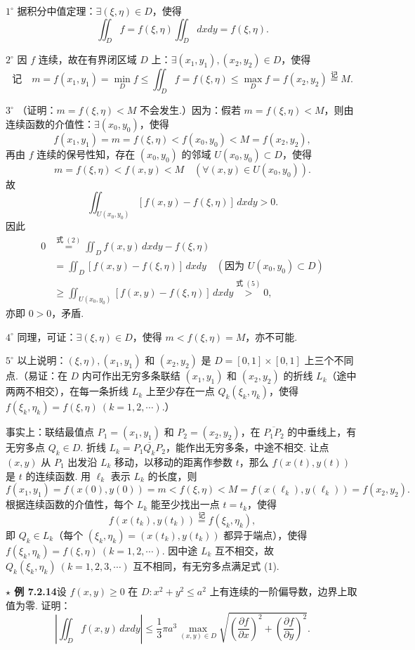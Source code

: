\documentclass[UTF8,12pt,a4paper,fontset=fandol]{ctexart}
\begin{document}
$1^\circ$ 据积分中值定理：$\exists(\xi,\eta)\in D$，使得
\[
\iint_Df=f(\xi,\eta)\iint_Ddxdy=f(\xi,\eta). \tag{2}
\]

$2^\circ$ 因 $f$ 连续，故在有界闭区域 $D$ 上：$\exists(x_1,y_1),(x_2,y_2)\in D$，使得
\[
\text{记}\quad m=f(x_1,y_1)=\min_D f\le \iint_Df=f(\xi,\eta)\le\max_D f=f(x_2,y_2)\stackrel{\text{记}}=M. \tag{3}
\]

$3^\circ$ （证明：$m=f(\xi,\eta)<M$ 不会发生.）因为：假若 $m=f(\xi,\eta)<M$，则由连续函数的介值性：$\exists(x_0,y_0)$，使得
\[
f(x_1,y_1)=m=f(\xi,\eta)<f(x_0,y_0)<M=f(x_2,y_2), \tag{4}
\]
再由 $f$ 连续的保号性知，存在 $(x_0,y_0)$ 的邻域 $U(x_0,y_0)\subset D$，使得
\[
m=f(\xi,\eta)<f(x,y)<M\quad(\forall(x,y)\in U(x_0,y_0)).
\]
故
\[
\iint_{U(x_0,y_0)}[f(x,y)-f(\xi,\eta)]\,dxdy>0. \tag{5}
\]
因此
\[
\begin{aligned}
0&\stackrel{\text{式 }(2)}=\iint_D f(x,y)\,dxdy-f(\xi,\eta)\\
&=\iint_D[f(x,y)-f(\xi,\eta)]\,dxdy
\quad(\text{因为 }U(x_0,y_0)\subset D)\\
&\ge\iint_{U(x_0,y_0)}[f(x,y)-f(\xi,\eta)]\,dxdy
\stackrel{\text{式 }(5)}>0,
\end{aligned}
\tag{6}
\]
亦即 $0>0$，矛盾.

$4^\circ$ 同理，可证：$\exists(\xi,\eta)\in D$，使得 $m<f(\xi,\eta)=M$，亦不可能.

$5^\circ$ 以上说明：$(\xi,\eta),(x_1,y_1)$ 和 $(x_2,y_2)$ 是 $D=[0,1]\times[0,1]$ 上三个不同点.（易证：在 $D$ 内可作出无穷多条联结 $(x_1,y_1)$ 和 $(x_2,y_2)$ 的折线 $L_k$（途中两两不相交），在每一条折线 $L_k$ 上至少存在一点 $Q_k(\xi_k,\eta_k)$，使得 $f(\xi_k,\eta_k)=f(\xi,\eta)\ (k=1,2,\cdots)$.）

事实上：联结最值点 $P_1=(x_1,y_1)$ 和 $P_2=(x_2,y_2)$，在 $\overline{P_1P_2}$ 的中垂线上，有无穷多点 $Q_k\in D$. 折线 $L_k=\overline{P_1Q_kP_2}$，能作出无穷多条，中途不相交. 让点 $(x,y)$ 从 $P_1$ 出发沿 $L_k$ 移动，以移动的距离作参数 $t$，那么 $f(x(t),y(t))$ 是 $t$ 的连续函数. 用 $\ell_k$ 表示 $L_k$ 的长度，则
\[
f(x_1,y_1)=f(x(0),y(0))=m<f(\xi,\eta)<M=f(x(\ell_k),y(\ell_k))=f(x_2,y_2).
\]
根据连续函数的介值性，每个 $L_k$ 能至少找出一点 $t=t_k$，使得
\[
f(x(t_k),y(t_k))\stackrel{\text{记}}=f(\xi_k,\eta_k),
\]
即 $Q_k\in L_k$（每个 $(\xi_k,\eta_k)=(x(t_k),y(t_k))$ 都异于端点），使得 $f(\xi_k,\eta_k)=f(\xi,\eta)\ (k=1,2,\cdots)$. 因中途 $L_k$ 互不相交，故 $Q_k(\xi_k,\eta_k)\ (k=1,2,3,\cdots)$ 互不相同，有无穷多点满足式 (1).

\noindent\textbf{$\star$ 例 7.2.14}\quad 设 $f(x,y)\ge0$ 在 $D:x^2+y^2\le a^2$ 上有连续的一阶偏导数，边界上取值为零. 证明：
\[
\left|\iint_D f(x,y)\,dxdy\right|
\le\frac13\pi a^3\max_{(x,y)\in D}\sqrt{\left(\frac{\partial f}{\partial x}\right)^2+\left(\frac{\partial f}{\partial y}\right)^2}.
\]
\end{document}
